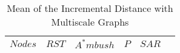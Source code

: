 \begin{table}[h]
\caption{Mean of the Incremental Distance with Multiscale Graphs}
\begin{center}

\begin{tabular}{|c|c|c|c|c|c|}
\hline
$Nodes$ & $RST$ & $A^*mbush$ & $P$ & $SAR$\\
\hline

\hline
\end{tabular}

\label{tab:multiscale_incr}
\end{center}
\end{table}
